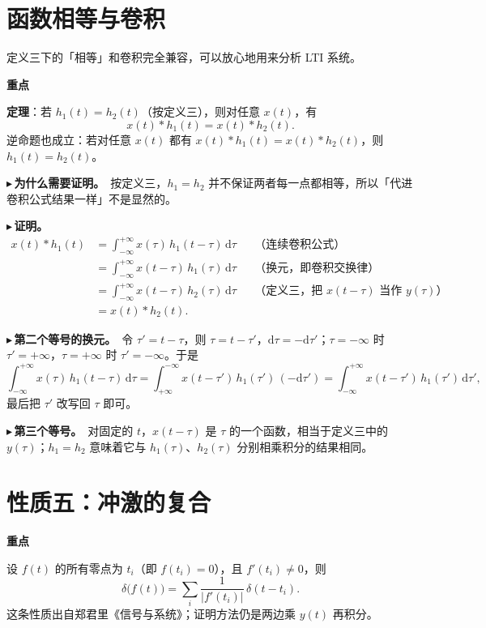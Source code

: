 \documentclass[UTF8,a4paper,11pt]{ctexart}
\newenvironment{remember}{\begin{rememberbox}\textbf{重点}\par\smallskip}{\end{rememberbox}}
\newcounter{ex}[section]
\newcommand{\point}[1]{\par\addvspace{1ex}\noindent\textcolor{ptteal}{$\blacktriangleright$\,\textbf{#1}}\ }
\begin{document}
\section{函数相等与卷积}\label{sec:conv}
定义三下的「相等」和卷积完全兼容，可以放心地用来分析 LTI 系统。

\begin{remember}
\textbf{定理}：若 $h_1(t)=h_2(t)$（按定义三），则对任意 $x(t)$，有
\[
x(t)\ast h_1(t)=x(t)\ast h_2(t).
\]
逆命题也成立：若对任意 $x(t)$ 都有 $x(t)\ast h_1(t)=x(t)\ast h_2(t)$，则 $h_1(t)=h_2(t)$。
\end{remember}

\point{为什么需要证明。}按定义三，$h_1=h_2$ 并不保证两者每一点都相等，所以「代进卷积公式结果一样」不是显然的。

\point{证明。}
\begin{align*}
x(t)\ast h_1(t)
&=\int_{-\infty}^{+\infty}x(\tau)\,h_1(t-\tau)\,\mathrm{d}\tau
&&\text{（连续卷积公式）}\\
&=\int_{-\infty}^{+\infty}x(t-\tau)\,h_1(\tau)\,\mathrm{d}\tau
&&\text{（换元，即卷积交换律）}\\
&=\int_{-\infty}^{+\infty}x(t-\tau)\,h_2(\tau)\,\mathrm{d}\tau
&&\text{（定义三，把 $x(t-\tau)$ 当作 $y(\tau)$）}\\
&=x(t)\ast h_2(t).
\end{align*}

\point{第二个等号的换元。}令 $\tau'=t-\tau$，则 $\tau=t-\tau'$，$\mathrm{d}\tau=-\mathrm{d}\tau'$；$\tau=-\infty$ 时 $\tau'=+\infty$，$\tau=+\infty$ 时 $\tau'=-\infty$。于是
\[
\int_{-\infty}^{+\infty}x(\tau)\,h_1(t-\tau)\,\mathrm{d}\tau
=\int_{+\infty}^{-\infty}x(t-\tau')\,h_1(\tau')\,(-\mathrm{d}\tau')
=\int_{-\infty}^{+\infty}x(t-\tau')\,h_1(\tau')\,\mathrm{d}\tau',
\]
最后把 $\tau'$ 改写回 $\tau$ 即可。

\point{第三个等号。}对固定的 $t$，$x(t-\tau)$ 是 $\tau$ 的一个函数，相当于定义三中的 $y(\tau)$；$h_1=h_2$ 意味着它与 $h_1(\tau)$、$h_2(\tau)$ 分别相乘积分的结果相同。

\section{性质五：冲激的复合}\label{sec:p5}
\begin{remember}
设 $f(t)$ 的所有零点为 $t_i$（即 $f(t_i)=0$），且 $f'(t_i)\ne0$，则
\[
\delta\big(f(t)\big)=\sum_{i}\frac{1}{|f'(t_i)|}\,\delta(t-t_i).
\]
这条性质出自郑君里《信号与系统》；证明方法仍是两边乘 $y(t)$ 再积分。
\end{remember}
\end{document}
